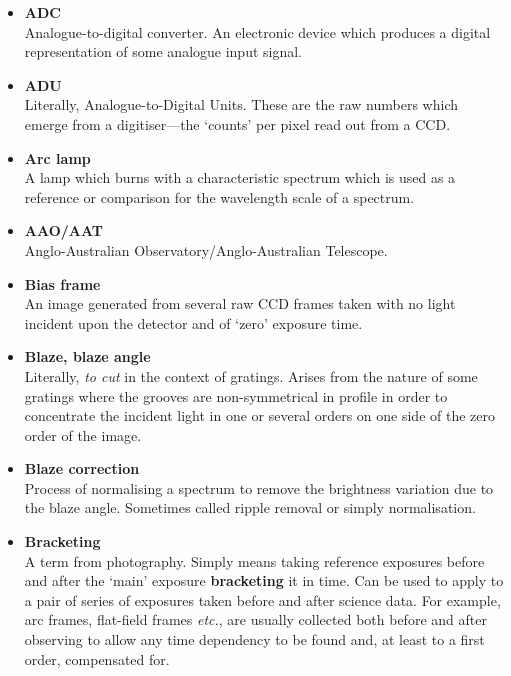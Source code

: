 \documentclass[twoside,11pt]{article}
\newcommand{\htmlref}[2]{#1}
\newcommand{\scspec}[2]{#1}
\newcommand{\scspec}[2]{#2}
\begin{document}
\begin{itemize}

\item {\bf\label{gl_adc}ADC}\\
      Analogue-to-digital converter.  An electronic device which produces
      a digital representation of some analogue input signal.

\item {\bf\label{gl_adu}ADU}\\
      Literally, Analogue-to-Digital Units.  These are the raw numbers
      which emerge from a digitiser\scspec{---}{ - }the `counts' per pixel
      read out from a CCD.

\item {\bf\label{gl_arc_lamp}Arc lamp}\\
      A lamp which burns with a characteristic spectrum which is used as
      a reference or comparison for the
      \htmlref{wavelength scale}{gl_wavelength} of a spectrum.

\item {\bf\label{gl_aao_aat}AAO/AAT}\\
      Anglo-Australian Observatory/Anglo-Australian Telescope.

\item {\bf\label{gl_bias_frame}Bias frame}\\
      An image generated from several raw CCD frames taken with no
      light incident upon the detector and of `zero' exposure time.

\item {\bf\label{gl_blaze}Blaze, blaze angle}\\
      Literally, {\sl to cut\/} in the context of
      \htmlref{gratings}{gl_grating}.
      Arises from the nature of some gratings where the grooves are
      non-symmetrical in profile in order to concentrate the incident
      light in one or several orders on one side of the zero order of
      the image.

\item {\bf\label{gl_blaze_correction}Blaze correction}\\
      Process of normalising a spectrum
      to remove the brightness variation due to the blaze angle.
      Sometimes called ripple removal or simply normalisation.

\item {\bf\label{gl_bracketing}Bracketing}\\
      A term from photography.  Simply means taking reference exposures
      before and after the `main' exposure {\bf bracketing} it in time.
      Can be used to apply to a pair of series of exposures taken before
      and after science data.  For example, arc frames, flat-field frames
      {\em etc.}, are usually collected both before and after observing to
      allow any time dependency to be found and, at least to a first order,
      compensated for.


\end{itemize}
\end{document}
